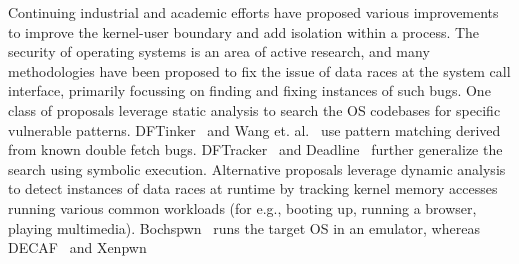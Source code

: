 Continuing industrial and academic efforts have proposed various 
improvements to improve the kernel-user boundary and add isolation within
a process.
The security of operating systems is an area of active research, and many
methodologies have been proposed to fix the issue of data races at the system
call interface, primarily focussing on finding and fixing instances of such
bugs.
One class of proposals leverage static analysis to search the 
OS codebases for specific vulnerable patterns.
DFTinker~\cite{dftinker} and Wang et. al.~\cite{wang2017double} use
pattern matching derived from known double fetch bugs.
DFTracker~\cite{wang2019dftracker} and Deadline~\cite{deadline} further
generalize the search using symbolic execution.
Alternative proposals
leverage dynamic analysis to detect instances of data races at runtime
by tracking kernel memory accesses running various common 
workloads (for e.g., booting up, running a browser, playing multimedia).
Bochspwn~\cite{jurczyk2013bochspwn} runs the target OS in an emulator, 
whereas DECAF~\cite{schwartzDECAF} and Xenpwn~\cite{wilhelm2016xenpwn}
